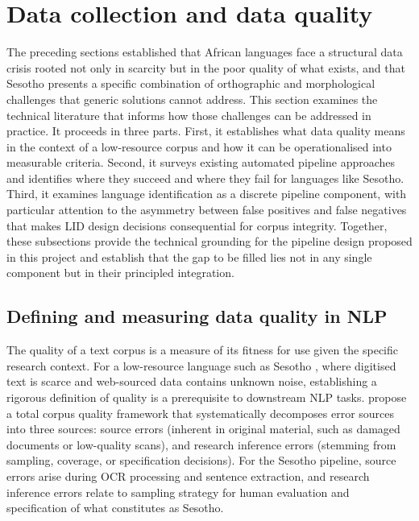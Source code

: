 \documentclass[12pt]{ThesisRU}
\begin{document}
\section{Data collection and data quality}
The preceding sections established that African languages face a structural data crisis rooted not only in scarcity but in the poor quality of what exists, and that Sesotho presents a specific combination of orthographic and morphological challenges that generic solutions cannot address. This section examines the technical literature that informs how those challenges can be addressed in practice. It proceeds in three parts. First, it establishes what data quality means in the context of a low-resource corpus and how it can be operationalised into measurable criteria. Second, it surveys existing automated pipeline approaches and identifies where they succeed and where they fail for languages like Sesotho. Third, it examines language identification as a discrete pipeline component, with particular attention to the asymmetry between false positives and false negatives that makes LID design decisions consequential for corpus integrity. Together, these subsections provide the technical grounding for the pipeline design proposed in this project and establish that the gap to be filled lies not in any single component but in their principled integration.
\subsection{Defining and measuring data quality in NLP}
The quality of a text corpus is a measure of its fitness for use given the specific research context. For a low-resource language such as Sesotho , where digitised text is scarce and web-sourced data contains unknown noise, establishing a rigorous definition of quality is a prerequisite to downstream NLP tasks. \citet{hurtado2022documents} propose a total corpus quality framework that systematically decomposes error sources into three sources: source errors (inherent in original material, such as damaged documents or low-quality scans), and research inference errors (stemming from sampling, coverage, or specification decisions). For the Sesotho pipeline, source errors arise during OCR processing and sentence extraction, and research inference errors relate to sampling strategy for human evaluation and specification of what constitutes as Sesotho.
\end{document}
